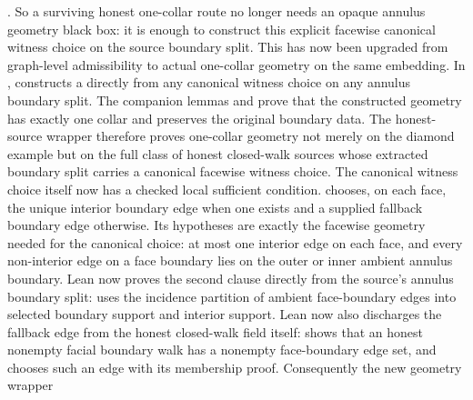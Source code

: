 \documentclass[11pt]{article}
\begin{document}
.
So a surviving honest one-collar route no longer needs an opaque annulus
geometry black box: it is enough to construct this explicit facewise canonical
witness choice on the source boundary split.
This has now been upgraded from graph-level admissibility to actual
one-collar geometry on the same embedding.  In
,
constructs a  directly from any
canonical witness choice on any annulus boundary split.  The companion lemmas
and
prove that the constructed geometry has exactly one collar and preserves the
original boundary data.  The honest-source wrapper
therefore proves one-collar geometry not merely on the diamond example but on
the full class of honest closed-walk sources whose extracted boundary split
carries a canonical facewise witness choice.
The canonical witness choice itself now has a checked local sufficient
condition.  
chooses, on each face, the unique interior boundary edge when one exists and a
supplied fallback boundary edge otherwise.  Its hypotheses are exactly the
facewise geometry needed for the canonical choice: at most one interior edge on
each face, and every non-interior edge on a face boundary lies on the outer or
inner ambient annulus boundary.  Lean now proves the second clause directly
from the source's annulus boundary split:
uses the incidence partition of ambient face-boundary edges into selected
boundary support and interior support.  Lean now also discharges the fallback
edge from the honest closed-walk field itself:
shows that an honest nonempty facial boundary walk has a nonempty face-boundary
edge set, and
 chooses such
an edge with its membership proof.  Consequently the new geometry wrapper
\end{document}
